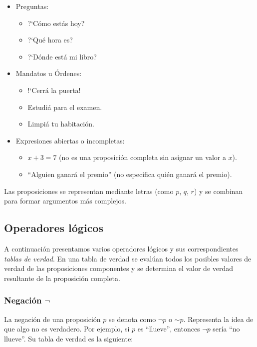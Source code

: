 \begin{fmd-example}
	\begin{itemize}
		\item Preguntas:
		\begin{itemize}
			\item ?`Cómo estás hoy?
			\item ?`Qué hora es?
			\item ?`Dónde está mi libro?
		\end{itemize}
		
		\item Mandatos u Órdenes:
		\begin{itemize}
			\item !`Cerrá la puerta!
			\item Estudiá para el examen.
			\item Limpiá tu habitación.
		\end{itemize}
		
		\item Expresiones abiertas o incompletas:
		\begin{itemize}
			\item $x + 3 = 7$ (no es una proposición completa sin asignar un valor a $x$).
			\item ``Alguien ganará el premio'' (no especifica quién ganará el premio).
		\end{itemize}
	\end{itemize}
\end{fmd-example}

Las proposiciones se representan mediante letras (como $p$, $q$, $r$) y se combinan para formar argumentos más complejos.

\subsection{Operadores lógicos} \label{sec:operadores_logicos}

A continuación presentamos varios operadores lógicos y sus correspondientes \textit{tablas de verdad}. En una tabla de verdad se evalúan todos los posibles valores de verdad de las proposiciones componentes y se determina el valor de verdad resultante de la proposición completa.

\subsubsection{Negación $\neg$}
La negación de una proposición $p$ se denota como $\neg p$ o $\sim p$. Representa la idea de que algo no es verdadero. Por ejemplo, si $p$ es ``llueve'', entonces $\neg p$ sería ``no llueve''. Su tabla de verdad es la siguiente:

